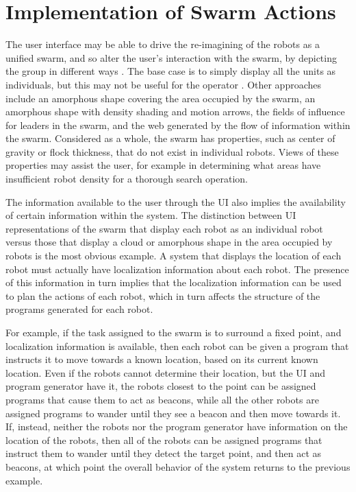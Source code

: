 \chapter{Implementation of Swarm Actions} \label{chapter:Implementation_of_Swarm_Actions}

The user interface may be able to drive the re-imagining of the robots as a unified swarm, and so alter the user's interaction with the swarm, by depicting the group in different ways \citep{manning2015heuristic}.
The base case is to simply display all the units as individuals, but this may not be useful for the operator \citep{coppin2012controlling}. 
Other approaches include an amorphous shape covering the area occupied by the swarm, an amorphous shape with density shading and motion arrows, the fields of influence for leaders in the swarm, and the web generated by the flow of information within the swarm. 
Considered as a whole, the swarm has properties, such as center of gravity or flock thickness, that do not exist in individual robots. 
Views of these properties may assist the user, for example in determining what areas have insufficient robot density for a thorough search operation. 

The information available to the user through the UI also implies the availability of certain information within the system. 
The distinction between UI representations of the swarm that display each robot as an individual robot versus those that display a cloud or amorphous shape in the area occupied by robots is the most obvious example. 
A system that displays the location of each robot must actually have localization information about each robot.
The presence of this information in turn implies that the localization information can be used to plan the actions of each robot, which in turn affects the structure of the programs generated for each robot. 

For example, if the task assigned to the swarm is to surround a fixed point, and localization information is available, then each robot can be given a program that instructs it to move towards a known location, based on its current known location.
Even if the robots cannot determine their location, but the UI and program generator have it, the robots closest to the point can be assigned programs that cause them to act as beacons, while all the other robots are assigned programs to wander until they see a beacon and then move towards it. 
If, instead, neither the robots nor the program generator have information on the location of the robots, then all of the robots can be assigned programs that instruct them to wander until they detect the target point, and then act as beacons, at which point the overall behavior of the system returns to the previous example.

